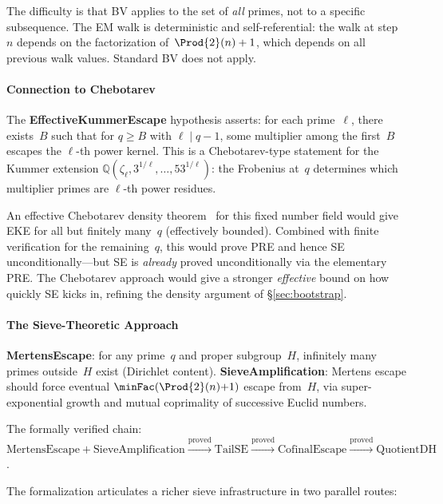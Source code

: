 The difficulty is that BV applies to the set of \emph{all} primes,
not to a specific subsequence.  The EM walk is deterministic and
self-referential: the walk at step~$n$ depends on the factorization
of~$\Prod{2}(n)+1$, which depends on all previous walk values.  Standard
BV does not apply.

\paragraph{Connection to Chebotarev}

The \textbf{EffectiveKummerEscape} hypothesis asserts: for each
prime~$\ell$, there exists~$B$ such that for $q \geq B$ with
$\ell \mid q\!-\!1$, some multiplier among the first~$B$ escapes the
$\ell$-th power kernel.  This is a Chebotarev-type statement for the
Kummer extension $\mathbb{Q}(\zeta_\ell, 3^{1/\ell}, \ldots,
53^{1/\ell})$: the Frobenius at~$q$ determines which multiplier
primes are $\ell$-th power residues.

An effective Chebotarev density theorem~\cite{LagariasOdlyzko1977}
for this fixed number field
would give EKE for all but finitely many~$q$ (effectively bounded).
Combined with finite verification for the remaining~$q$, this would
prove PRE and hence SE unconditionally---but SE is
\emph{already} proved unconditionally via the elementary PRE.
The Chebotarev approach would give a stronger \emph{effective}
bound on how quickly SE kicks in, refining the density argument of
\S\ref{sec:bootstrap}.

\paragraph{The Sieve-Theoretic Approach}

\textbf{Mertens\-Escape}: for any prime~$q$ and proper
subgroup~$H$, infinitely many primes outside~$H$ exist
(Dirichlet content).
\textbf{Sieve\-Amplification}: Mertens escape should force
eventual $\minFac(\Prod{2}(n){+}1)$ escape from~$H$, via
super-exponential growth and mutual coprimality of
successive Euclid numbers.

The formally verified chain:
$\mathrm{MertensEscape} + \mathrm{SieveAmplification}
\xrightarrow{\text{proved}}
\mathrm{TailSE} \xrightarrow{\text{proved}}
\mathrm{CofinalEscape} \xrightarrow{\text{proved}}
\mathrm{QuotientDH}$.

The formalization articulates a richer sieve infrastructure in two parallel
routes:

